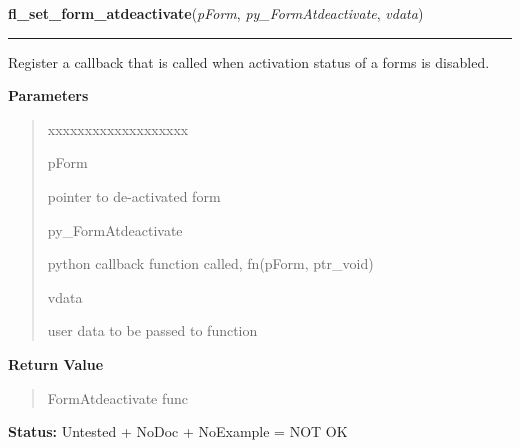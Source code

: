 \hspace{.8\funcindent}\begin{boxedminipage}{\funcwidth}

    \raggedright \textbf{fl\_set\_form\_atdeactivate}(\textit{pForm}, \textit{py\_FormAtdeactivate}, \textit{vdata})

    \vspace{-1.5ex}

    \rule{\textwidth}{0.5\fboxrule}
\setlength{\parskip}{2ex}
    Register a callback that is called when activation status of a forms is
    disabled.

\setlength{\parskip}{1ex}
      \textbf{Parameters}
      \vspace{-1ex}

      \begin{quote}
        \begin{Ventry}{xxxxxxxxxxxxxxxxxxx}

          \item[pForm]

          pointer to de-activated form

          \item[py\_FormAtdeactivate]

          python callback function called, fn(pForm, ptr\_void)

          \item[vdata]

          user data to be passed to function

        \end{Ventry}

      \end{quote}

      \textbf{Return Value}
    \vspace{-1ex}

      \begin{quote}
      FormAtdeactivate func

      \end{quote}

\textbf{Status:} Untested + NoDoc + NoExample = NOT OK



    \end{boxedminipage}

    \label{xformslib:library:fl_unfreeze_form}

    \vspace{0.5ex}

